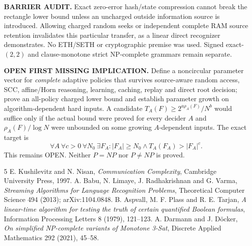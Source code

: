 \documentclass[11pt]{article}
\begin{document}
\textbf{BARRIER AUDIT.} Exact zero-error hash/state compression cannot break the rectangle lower bound unless an uncharged outside information source is introduced. Allowing charged random seeks or independent complete RAM source retention invalidates this particular transfer, as a linear direct recognizer demonstrates. No ETH/SETH or cryptographic premise was used. Signed exact-$(2,2)$ and clause-monotone strict NP-complete grammars remain separate.

\textbf{OPEN FIRST MISSING IMPLICATION.} Define a noncircular parameter vector for \emph{complete} adaptive policies that survives source-aware random access, SCC, affine/Horn reasoning, learning, caching, replay and direct root decision; prove an all-policy charged lower bound and establish parameter growth on algorithm-dependent hard inputs. A candidate $T_A(F)\ge 2^{a\rho_A(F)}/N^b$ would suffice only if the actual bound were proved for every decider $A$ and $\rho_A(F)/\log N$ were unbounded on some growing $A$-dependent inputs. The exact target is
\[
\forall A\ \forall c>0\ \forall N_0\ \exists F_A:
|F_A|\ge N_0\land T_A(F_A)>|F_A|^c.
\]
This remains OPEN. Neither $P=NP$ nor $P\ne NP$ is proved.

\begin{thebibliography}{5}
 E. Kushilevitz and N. Nisan, \emph{Communication Complexity}, Cambridge University Press, 1997.
 A. Babu, N. Limaye, J. Radhakrishnan and G. Varma, \emph{Streaming Algorithms for Language Recognition Problems}, Theoretical Computer Science 494 (2013); arXiv:1104.0848.
 B. Aspvall, M. F. Plass and R. E. Tarjan, \emph{A linear-time algorithm for testing the truth of certain quantified Boolean formulas}, Information Processing Letters 8 (1979), 121--123.
 A. Darmann and J. D\"ocker, \emph{On simplified NP-complete variants of Monotone 3-Sat}, Discrete Applied Mathematics 292 (2021), 45--58.
\end{thebibliography}
\end{document}
